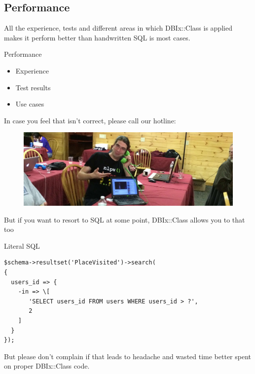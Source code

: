 \subsection{Performance}

All the experience, tests and different areas in which 
DBIx::Class is applied makes it perform better than
handwritten SQL is most cases.

\begin{frame}{Performance}
\begin{itemize}
\item Experience
\item Test results
\item Use cases
\end{itemize}
\end{frame}
 
In case you feel that isn't correct, please call our hotline:

\begin{frame}
\begin{figure}[!ht]
\centering
\includegraphics[width=1\linewidth]{img/perldance-2014-modern-tech.jpg}
\end{figure}
\end{frame}

But if you want to resort to SQL at some point, DBIx::Class allows you
to that too

\begin{frame}[fragile]{Literal SQL}
\begin{lstlisting}
$schema->resultset('PlaceVisited')->search(
{
  users_id => {
    -in => \[
       'SELECT users_id FROM users WHERE users_id > ?',
       2
    ]
  }
});
\end{lstlisting}
\end{frame}

But please don't complain if that leads to headache
and wasted time better spent on proper DBIx::Class
code.

